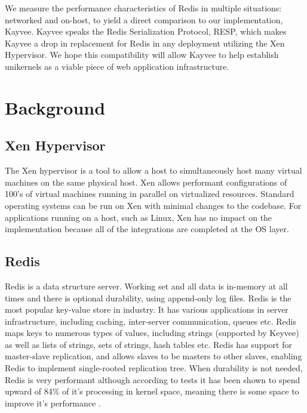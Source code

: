 \documentclass[english,10pt,twocolumn]{article}
\begin{document}
We measure the performance characteristics of Redis in multiple situations: networked and on-host, to yield a direct comparison to our implementation, Kayvee.
Kayvee speaks the Redis Serialization Protocol\cite{redis-protocol}, RESP, which makes Kayvee a drop in replacement for Redis in any deployment utilizing the Xen Hypervisor.
We hope this compatibility will allow Kayvee to help establish unikernels as a viable piece of web application infrastructure.


\section{Background}



\subsection{Xen Hypervisor}

The Xen hypervisor is a tool to allow a host to simultaneously host many virtual machines on the same physical host.
Xen allows performant configurations of 100's of virtual machines running in parallel on virtualized resources.
Standard operating systems can be run on Xen with minimal changes to the codebase.
For applications running on a host, such as Linux, Xen has no impact on the implementation because all of the integrations are completed at the OS layer.


\subsection{Redis}

Redis is a data structure server. Working set and all data is in-memory at all times and there is optional durability, using append-only log files. Redis is the most popular key-value store in industry\cite{dbengines}. It has various applications in server infrastructure, including caching, inter-server communication, queues etc. Redis maps keys to numerous types of values, including strings (supported by Keyvee) as well as lists of strings, sets of strings, hash tables etc. Redis has support for master-slave replication, and allows slaves to be masters to other slaves, enabling Redis to implement single-rooted replication tree. When durability is not needed, Redis is very performant although according to tests it has been shown to spend upward of 84\% of it's processing in kernel space, meaning there is some space to improve it's performance \cite{latency}.
\end{document}
